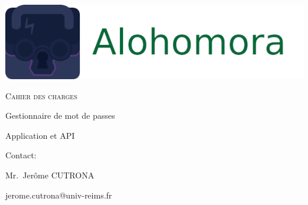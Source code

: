 \documentclass[oneside]{report}
\author{Sylvain COMBRAQUE, Sarah LAMOTTE, Nathan JANCZEWSKI, Léo BERGEROT}
\begin{document}
	\begin{titlepage}
		\centering
		\includegraphics[scale=.5]{logo_large}
		\vspace{5cm}
		{\par\scshape\Huge Cahier des charges\par}
		\vspace{5cm}
		{\par Gestionnaire de mot de passes\par}
		{\par Application et API\par}
		\vfill
		\par Contact:
		{\par\small Mr.\ Jerôme CUTRONA \par}
		\par jerome.cutrona@univ-reims.fr\
	\end{titlepage}

	\pagestyle{fancy}
	\fancyhf{}
	\tableofcontents
\end{document}
